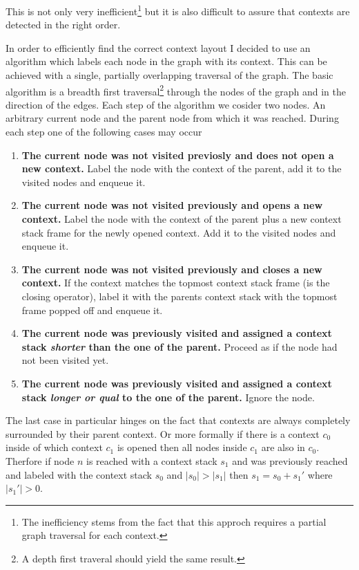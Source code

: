 This is not only very inefficient\footnote{The inefficiency stems from the fact that this approch requires a partial graph traversal for each context.} but it is also difficult to assure that contexts are detected in the right order.

In order to efficiently find the correct context layout I decided to use an algorithm which labels each node in the graph with its context.
This can be achieved with a single, partially overlapping traversal of the graph.
The basic algorithm is a breadth first traversal\footnote{A depth first traveral should yield the same result.} through the nodes of the graph and in the direction of the edges.
Each step of the algorithm we cosider two nodes.
An arbitrary current node and the parent node from which it was reached.
During each step one of the following cases may occur
\begin{enumerate}
    \item \textbf{The current node was not visited previosly and does not open a new context.} Label the node with the context of the parent, add it to the visited nodes and enqueue it.
    \item \textbf{The current node was not visited previously and opens a new context.} Label the node with the context of the parent plus a new context stack frame for the newly opened context. Add it to the visited nodes and enqueue it.
    \item \textbf{The current node was not visited previously and closes a new context.} If the context matches the topmost context stack frame (is the closing operator), label it with the parents context stack with the topmost frame popped off and enqueue it.
    \item \textbf{The current node was previously visited and assigned a context stack \textit{shorter} than the one of the parent.} Proceed as if the node had not been visited yet.
    \item \textbf{The current node was previously visited and assigned a context stack \textit{longer or qual} to the one of the parent.} Ignore the node.
\end{enumerate}

The last case in particular hinges on the fact that contexts are always completely surrounded by their parent context.
Or more formally if there is a context $c_0$ inside of which context $c_1$ is opened then all nodes inside $c_1$ are also in $c_0$.
Therfore if node $n$ is reached with a context stack $s_1$ and was previously reached and labeled with the context stack $s_0$ and $|s_0| > |s_1|$ then $s_1 = s_0 + s_1' $ where $ |s_1'| > 0$.
